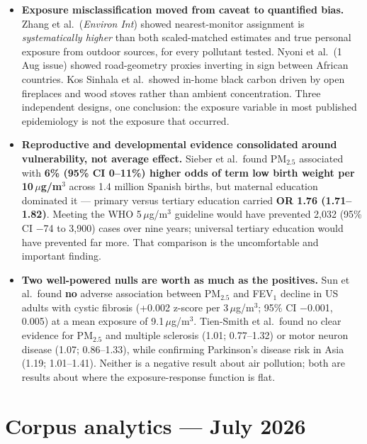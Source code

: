 \documentclass[10pt]{article}
\begin{document}
\begin{itemize}
\item \textbf{Exposure misclassification moved from caveat to quantified bias.} Zhang
et al.\ (\textit{Environ Int}) showed nearest-monitor assignment is \emph{systematically
higher} than both scaled-matched estimates and true personal exposure from outdoor
sources, for every pollutant tested. Nyoni et al.\ (1 Aug issue) showed road-geometry
proxies inverting in sign between African countries. Kos Sinhala et al.\ showed in-home
black carbon driven by open fireplaces and wood stoves rather than ambient concentration.
Three independent designs, one conclusion: the exposure variable in most published
epidemiology is not the exposure that occurred.

\item \textbf{Reproductive and developmental evidence consolidated around
vulnerability, not average effect.} Sieber et al.\ found PM$_{2.5}$ associated with
\textbf{6\% (95\% CI 0--11\%) higher odds of term low birth weight per 10\,$\mu$g/m$^3$}
across 1.4 million Spanish births, but maternal education dominated it --- primary versus
tertiary education carried \textbf{OR 1.76 (1.71--1.82)}. Meeting the WHO 5\,$\mu$g/m$^3$
guideline would have prevented 2{,}032 (95\% CI $-$74 to 3{,}900) cases over nine years;
universal tertiary education would have prevented far more. That comparison is the
uncomfortable and important finding.

\item \textbf{Two well-powered nulls are worth as much as the positives.} Sun et al.\
found \textbf{no} adverse association between PM$_{2.5}$ and FEV$_1$ decline in US adults
with cystic fibrosis (+0.002 z-score per 3\,$\mu$g/m$^3$; 95\% CI $-$0.001, 0.005) at a
mean exposure of 9.1\,$\mu$g/m$^3$. Tien-Smith et al.\ found no clear evidence for
PM$_{2.5}$ and multiple sclerosis (1.01; 0.77--1.32) or motor neuron disease (1.07;
0.86--1.33), while confirming Parkinson's disease risk in Asia (1.19; 1.01--1.41).
Neither is a negative result about air pollution; both are results about where the
exposure-response function is flat.
\end{itemize}

\vspace{3mm}

\section*{\sffamily\bfseries\color{Deep}Corpus analytics --- July 2026}
\vspace{-1.5mm}{\color{Coral}\rule{\linewidth}{1.1pt}}\vspace{2.5mm}
\end{document}
